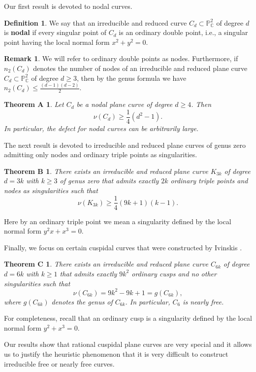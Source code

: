 \documentclass[12pt]{article}
\theoremstyle{plain}
\newtheorem*{theoremA}{Theorem A}
\newtheorem*{theoremB}{Theorem B}
\newtheorem*{theoremC}{Theorem C}
\theoremstyle{definition}
\newtheorem{definition}[thm]{Definition}
\newtheorem{remark}[thm]{Remark}
\begin{document}
Our first result is devoted to nodal curves.
\begin{definition}
We say that an irreducible and reduced curve $C_{d} \subset \mathbb{P}^{2}_{\mathbb{C}}$ of degree $d$ is \textbf{nodal} if every singular point of $C_{d}$ is an ordinary double point, i.e., a singular point having the local normal form $x^{2} + y^{2}=0$.
\end{definition}
\begin{remark}
We will refer to ordinary double points as nodes. Furthermore, if $n_{2}(C_{d})$ denotes the number of nodes of an irreducible and reduced plane curve $C_{d} \subset \mathbb{P}^{2}_{\mathbb{C}}$ of degree $d \geq 3$, then by the genus formula we have $n_{2}(C_{d}) \leq \frac{(d-1)(d-2)}{2}$.
\end{remark}
\begin{theoremA} Let $C_{d}$ be a nodal plane curve of degree $d\geq 4$. Then
$$\nu(C_{d}) \geq \frac{1}{4}(d^{2}-1).$$
In particular, the defect for nodal curves can be arbitrarily large.
\end{theoremA}
The next result is devoted to irreducible and reduced plane curves of genus zero admitting only nodes and ordinary triple points as singularities.
\begin{theoremB}
There exists an irreducible and reduced plane curve $K_{3k}$ of degree $d=3k$ with $k\geq 3$ of genus zero that admits exactly $2k$ ordinary triple points and nodes as singularities such that
$$\nu(K_{3k}) \geq \frac{1}{4}(9k+1)(k-1).$$
\end{theoremB}
\noindent
Here by an ordinary triple point we mean a singularity defined by the local normal form $y^{2}x + x^{3}=0$.


Finally, we focus on certain cuspidal curves that were constructed by Ivinskis \cite{Ivinskis}.
\begin{theoremC}
There exists an irreducible and reduced plane curve $C_{6k}$ of degree $d=6k$ with $k\geq 1$ that admits exactly $9k^2$ ordinary cusps and no other singularities such that
$$\nu(C_{6k}) = 9k^2-9k+1 = g(C_{6k}),$$
where $g(C_{6k})$ denotes the genus of $C_{6k}$.
In particular, $C_{6}$ is nearly free.
\end{theoremC}
\noindent
For completeness, recall that an ordinary cusp is a singularity defined by the local normal form $y^2 + x^{3} = 0$.

Our results show that rational cuspidal plane curves are very special and it allows us to justify the heuristic phenomenon that it is very difficult to construct irreducible free or nearly free curves.
\end{document}
